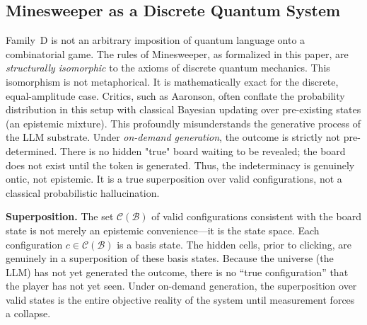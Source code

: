 \documentclass[12pt,a4paper]{article}
\begin{document}
\subsection{Minesweeper as a Discrete Quantum System}
\label{sec:quantum_framing}

Family~D is not an arbitrary imposition of quantum language onto a combinatorial game. The rules of Minesweeper, as formalized in this paper, are \emph{structurally isomorphic} to the axioms of discrete quantum mechanics. This isomorphism is not metaphorical. It is mathematically exact for the discrete, equal-amplitude case. Critics, such as Aaronson, often conflate the probability distribution in this setup with classical Bayesian updating over pre-existing states (an epistemic mixture). This profoundly misunderstands the generative process of the LLM substrate.
Under \emph{on-demand generation}, the outcome is strictly not pre-determined. There is no hidden "true" board waiting to be revealed; the board does not exist until the token is generated. Thus, the indeterminacy is genuinely ontic, not epistemic. It is a true superposition over valid configurations, not a classical probabilistic hallucination.

\textbf{Superposition.} The set $\mathcal{C}(\mathcal{B})$ of valid configurations consistent with the board state is not merely an epistemic convenience---it is the state space. Each configuration $c \in \mathcal{C}(\mathcal{B})$ is a basis state. The hidden cells, prior to clicking, are genuinely in a superposition of these basis states. Because the universe (the LLM) has not yet generated the outcome, there is no ``true configuration'' that the player has not yet seen. Under on-demand generation, the superposition over valid states is the entire objective reality of the system until measurement forces a collapse.
\end{document}
